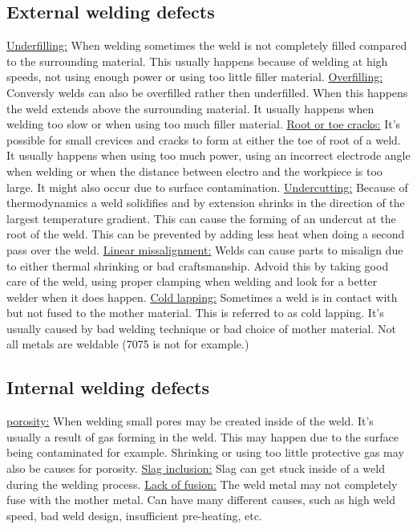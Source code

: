 \documentclass[11pt, a4paper]{article}
\begin{document}
\subsection{External welding defects}
\underline{Underfilling:} When welding sometimes the weld is not completely filled compared to the surrounding material. This usually happens because of welding at high speeds, not using enough power or using too little filler material.
\newline
\underline{Overfilling:} Conversly welds can also be overfilled rather then underfilled. When this happens the weld extends above the surrounding material. It usually happens when welding too slow or when using too much filler material.
\newline
\underline{Root or toe cracks:} It's possible for small crevices and cracks to form at either the toe of root of a weld. It usually happens when using too much power, using an incorrect electrode angle when welding or when the distance between electro and the workpiece is too large. It might also occur due to surface contamination.
\newline
\underline{Undercutting:} Because of thermodynamics a weld solidifies and by extension shrinks in the direction of the largest temperature gradient. This can cause the forming of an undercut at the root of the weld. This can be prevented by adding less heat when doing a second pass over the weld.
\newline
\underline{Linear missalignment:} Welds can cause parts to misalign due to either thermal shrinking or bad craftsmanship. Advoid this by taking good care of the weld, using proper clamping when welding and look for a better welder when it does happen.
\newline
\underline{Cold lapping:} Sometimes a weld is in contact with but not fused to the mother material. This is referred to as cold lapping. It's usually caused by bad welding technique or bad choice of mother material. Not all metals are weldable (7075  is not for example.)


\subsection{Internal welding defects}
\underline{porosity:} When welding small pores may be created inside of the weld. It's usually a result of gas forming in the weld. This may happen due to the surface being contaminated for example. Shrinking or using too little protective gas may also be causes for porosity.
\newline
\underline{Slag inclusion:} Slag can get stuck inside of a weld during the welding process.
\newline
\underline{Lack of fusion:} The weld metal may not completely fuse with the mother metal. Can have many different causes, such as high weld speed, bad weld design, insufficient pre-heating, etc.
\newline
\end{document}
